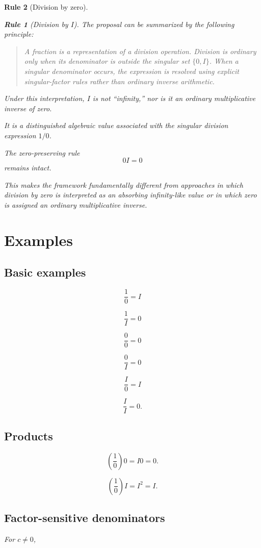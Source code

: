 \documentclass[11pt,a4paper]{article}
\newtheorem{rulethm}{Rule}[section]
\begin{document}
\begin{rulethm}[Division by zero]
\begin{rulethm}[Division by $I$]
The proposal can be summarized by the following principle:

\begin{quote}
A fraction is a representation of a division operation. Division is
ordinary only when its denominator is outside the singular set
$\{0,I\}$. When a singular denominator occurs, the expression is resolved
using explicit singular-factor rules rather than ordinary inverse
arithmetic.
\end{quote}

Under this interpretation, $I$ is not ``infinity,'' nor is it an ordinary
multiplicative inverse of zero.

It is a distinguished algebraic value associated with the singular division
expression $1/0$.

The zero-preserving rule
\[
0I=0
\]
remains intact.

This makes the framework fundamentally different from approaches in which
division by zero is interpreted as an absorbing infinity-like value or in
which zero is assigned an ordinary multiplicative inverse.

\section{Examples}

\subsection{Basic examples}

\[
\frac10=I
\]

\[
\frac1I=0
\]

\[
\frac00=0
\]

\[
\frac0I=0
\]

\[
\frac I0=I
\]

\[
\frac II=0.
\]

\subsection{Products}

\[
\left(\frac10\right)0
=
I0
=
0.
\]

\[
\left(\frac10\right)I
=
I^2
=
I.
\]

\subsection{Factor-sensitive denominators}

For $c\neq0$,


\end{rulethm}
\end{rulethm}
\end{document}
